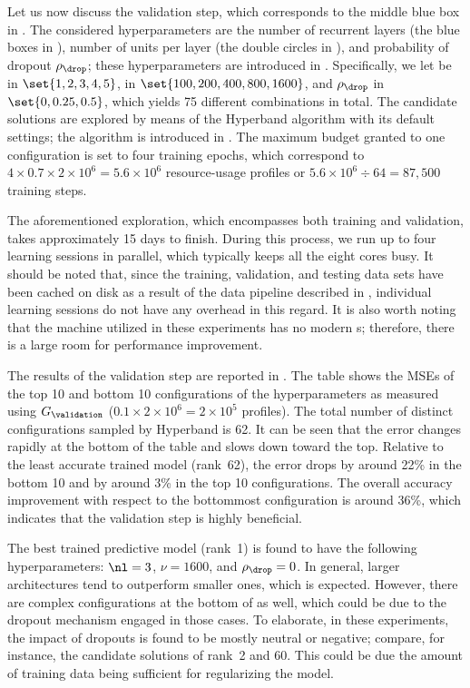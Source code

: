 Let us now discuss the validation step, which corresponds to the middle blue box
in . The considered hyperparameters are the number of
recurrent layers \nl (the blue boxes in ), number
of units per layer \nu (the double circles in ),
and probability of dropout $\rho_\drop$; these hyperparameters are introduced in
. Specifically, we let \nl be in $\set{1, 2, 3, 4,
5}$, \nu in $\set{100, 200, 400, 800, 1600}$, and $\rho_\drop$ in $\set{0, 0.25,
0.5}$, which yields 75 different combinations in total. The candidate solutions
are explored by means of the Hyperband algorithm with its default settings; the
algorithm is introduced in . The maximum budget
granted to one configuration is set to four training epochs, which correspond to
$4 \times 0.7 \times 2 \times 10^6 = 5.6 \times 10^6$ resource-usage profiles or
$5.6 \times 10^6 \div 64 = 87{,}500$ training steps.

The aforementioned exploration, which encompasses both training and validation,
takes approximately 15 days to finish. During this process, we run up to four
learning sessions in parallel, which typically keeps all the eight cores busy.
It should be noted that, since the training, validation, and testing data sets
have been cached on disk as a result of the data pipeline described in
, individual learning sessions do not have any
overhead in this regard. It is also worth noting that the machine utilized in
these experiments has no modern s; therefore, there is a large room for
performance improvement.

The results of the validation step are reported in . The
table shows the \acp{MSE} of the top 10 and bottom 10 configurations of the
hyperparameters as measured using $G_\validation$ ($0.1 \times 2 \times 10^6 = 2
\times 10^5$ profiles). The total number of distinct configurations sampled by
Hyperband is 62. It can be seen that the error changes rapidly at the bottom of
the table and slows down toward the top. Relative to the least accurate trained
model (rank~62), the error drops by around 22\% in the bottom 10 and by around
3\% in the top 10 configurations. The overall accuracy improvement with respect
to the bottommost configuration is around 36\%, which indicates that the
validation step is highly beneficial.

The best trained predictive model (rank~1) is found to have the following
hyperparameters: $\nl = 3$, $\nu = 1600$, and $\rho_\drop = 0$. In general,
larger architectures tend to outperform smaller ones, which is expected.
However, there are complex configurations at the bottom of
 as well, which could be due to the dropout mechanism
engaged in those cases. To elaborate, in these experiments, the impact of
dropouts is found to be mostly neutral or negative; compare, for instance, the
candidate solutions of rank~2 and 60. This could be due the amount of training
data being sufficient for regularizing the model.

